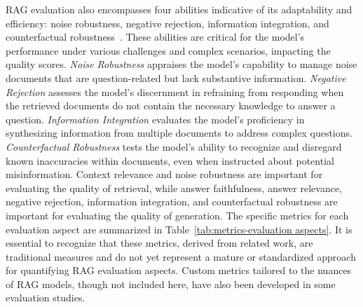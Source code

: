 RAG evaluation also encompasses four abilities indicative of its adaptability and efficiency: noise robustness, negative rejection, information integration, and counterfactual robustness~. These abilities are critical for the model's performance under various challenges and complex scenarios, impacting the quality scores. 
\emph{Noise Robustness} appraises the model's capability to manage noise documents that are question-related but lack substantive information.
\emph{Negative Rejection} assesses the model's discernment in refraining from responding when the retrieved documents do not contain the necessary knowledge to answer a question.
\emph{Information Integration} evaluates the model's proficiency in synthesizing information from multiple documents to address complex questions.
 \emph{Counterfactual Robustness} tests the model's ability to recognize and disregard known inaccuracies within documents, even when instructed about potential misinformation. 
Context relevance and noise robustness are important for evaluating the quality of retrieval, while answer faithfulness, answer relevance, negative rejection, information integration, and counterfactual robustness are important for evaluating the quality of generation.
The specific metrics for each evaluation aspect are summarized in Table~\ref{tab:metrics-evaluation aspects}. It is essential to recognize that these metrics, derived from related work, are traditional measures and do not yet represent a mature or standardized approach for quantifying RAG evaluation aspects. Custom metrics tailored to the nuances of RAG models, though not included here, have also been developed in some evaluation studies.
